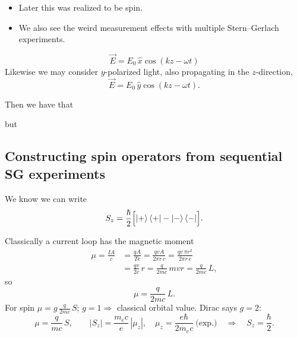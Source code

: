 \documentclass[12pt]{article}
\theoremstyle{plain}
\theoremstyle{remark}
\newcommand{\vecb}[1]{\vec{#1}}
\newcommand{\hbf}[1]{\hat{#1}}
\begin{document}
\begin{itemize}[label=$\Rightarrow$]
  \item Later this was realized to be spin.
  \item We also see the weird measurement effects with multiple Stern--Gerlach experiments.
\end{itemize}

\[
  \vecb{E} = E_0\,\hbf{x}\cos(kz - \omega t)
\]
Likewise we may consider $y$-polarized light, also propagating in the $z$-direction,
\[
  \vecb{E} = E_0\,\hbf{y}\cos(kz - \omega t) .
\]

Then we have that
\begin{center}
\end{center}
but
\begin{center}
\end{center}

\subsection{Constructing spin operators from sequential SG experiments}

We know we can write
\[
  S_z = \frac{\hbar}{2}\Bigl[\ket{+}\bra{+} - \ket{-}\bra{-}\Bigr] .
\]

Classically a current loop has the magnetic moment
\begin{align*}
  \mu = \frac{IA}{c} &= \frac{qA}{Tc} = \frac{qvA}{2\pi r\, c} = \frac{qv\,\pi r^2}{2\pi r\, c} \\
  &= \frac{qv}{2c}\, r = \frac{q}{2mc}\, m v r = \frac{q}{2mc}\, L ,
\end{align*}
so
\[
  \mu = \frac{q}{2mc}\, L .
\]
For spin $\displaystyle \mu = g\,\frac{q}{2mc}\, S$; $g = 1 \Rightarrow$ classical orbital value. Dirac says $g = 2$:
\[
  \mu = \frac{q}{mc}\, S , \qquad
  |S_z| = \frac{m_e c}{e}\,|\mu_z|, \quad \mu_z = \frac{e\hbar}{2 m_e c}\ \text{(exp.)} \quad\Rightarrow\quad S_z = \frac{\hbar}{2} .
\]
\end{document}
